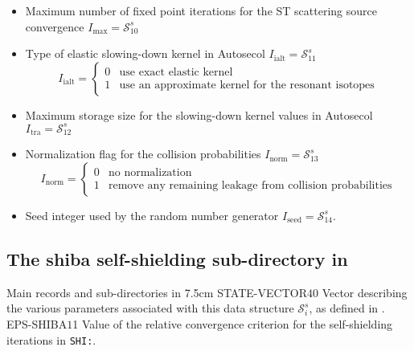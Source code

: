 \begin{itemize}
\item Maximum number of fixed point iterations for the ST scattering source convergence $I_{\mathrm{max}}=\mathcal{S}^{s}_{10}$ 

\item Type of elastic slowing-down kernel in Autosecol $I_{\mathrm{ialt}}=\mathcal{S}^{s}_{11}$ 
\begin{displaymath}
I_{\mathrm{ialt}} = \left\{
\begin{array}{ll}
0 & \textrm{use exact elastic kernel} \\
1 & \textrm{use an approximate kernel for the resonant isotopes}
\end{array} \right.
\end{displaymath}

\item Maximum storage size for the slowing-down kernel values in Autosecol $I_{\mathrm{tra}}=\mathcal{S}^{s}_{12}$ 

\item Normalization flag for the collision probabilities $I_{\mathrm{norm}}=\mathcal{S}^{s}_{13}$ 
\begin{displaymath}
I_{\mathrm{norm}} = \left\{
\begin{array}{ll}
0 & \textrm{no normalization} \\
1 & \textrm{remove any remaining leakage from collision probabilities}
\end{array} \right.
\end{displaymath}

\item Seed integer used by the random number generator $I_{\mathrm{seed}}=\mathcal{S}^{s}_{14}$.

\end{itemize}

\clearpage

\subsection{The {\sc shiba} self-shielding sub-directory  in
}\label{sect:shibadirselfshield}

\begin{DescriptionEnregistrement}{Main records and sub-directories in }{7.5cm}
\IntEnr
  {STATE-VECTOR}{$40$}
  {Vector describing the various parameters associated with this data structure $\mathcal{S}^{s}_{i}$,
  as defined in .}
\RealEnr
  {EPS-SHIBA}{$1$}{1}
  {Value of the relative convergence criterion for the self-shielding iterations in {\tt SHI:}. }
\end{DescriptionEnregistrement}

